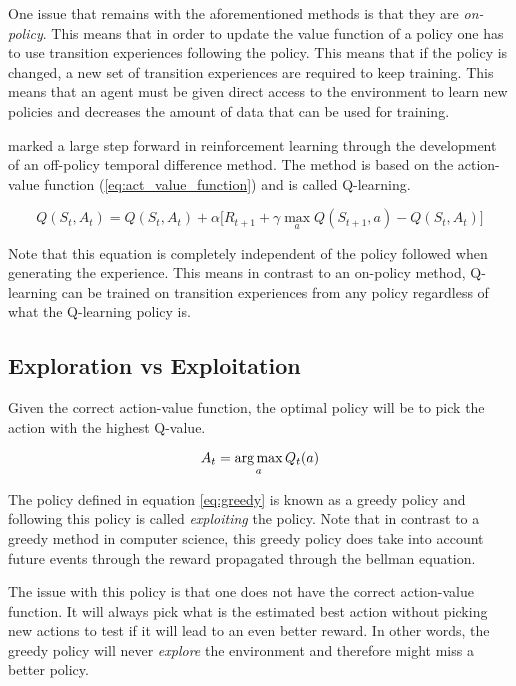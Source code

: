 One issue that remains with the aforementioned methods is that they are \textit{on-policy}. This means that in order to update the value function of a policy one has to use transition experiences following the policy. This means that if the policy is changed, a new set of transition experiences are required to keep training. This means that an agent must be given direct access to the environment to learn new policies and decreases the amount of data that can be used for training. 

\cite{watkins_dayan_1992} marked a large step forward in reinforcement learning through the development of an off-policy temporal difference method. The method is based on the action-value function (\ref{eq:act_value_function}) and is called Q-learning.

\begin{equation}
    \label{eq:td_q_learning}
    Q(S_t, A_t) = Q(S_t, A_t) + \alpha\big[R_{t+1} + \gamma \max_a Q(S_{t+1}, a) - Q(S_t, A_t)]
\end{equation}

Note that this equation is completely independent of the policy followed when generating the experience. This means in contrast to an on-policy method, Q-learning can be trained on transition experiences from any policy regardless of what the Q-learning policy is.

\subsection{Exploration vs Exploitation}

Given the correct action-value function, the optimal policy will be to pick the action with the highest Q-value.

\begin{equation}
    \label{eq:greedy}
    A_t = \operatorname*{arg\,max}_a Q_t(a)
\end{equation}

The policy defined in equation \ref{eq:greedy} is known as a greedy policy and following this policy is called \textit{exploiting} the policy. Note that in contrast to a greedy method in computer science, this greedy policy does take into account future events through the reward propagated through the bellman equation.

The issue with this policy is that one does not have the correct action-value function. It will always pick what is the estimated best action without picking new actions to test if it will lead to an even better reward. In other words, the greedy policy will never \textit{explore} the environment and therefore might miss a better policy.

